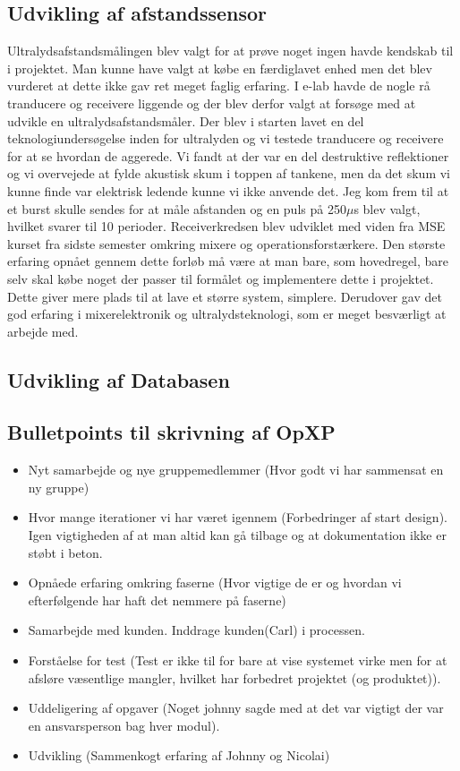 \subsection{Udvikling af afstandssensor}
Ultralydsafstandsmålingen blev valgt for at prøve noget ingen havde kendskab til i projektet. Man kunne have valgt at købe en færdiglavet enhed men det blev vurderet at dette ikke gav ret meget faglig erfaring. I e-lab havde de nogle rå tranducere og receivere liggende og der blev derfor valgt at forsøge med at udvikle en ultralydsafstandsmåler. Der blev i starten lavet en del teknologiundersøgelse inden for ultralyden og vi testede tranducere og receivere for at se hvordan de aggerede. Vi fandt at der var en del destruktive reflektioner og vi overvejede at fylde akustisk skum i toppen af tankene, men da det skum vi kunne finde var elektrisk ledende kunne vi ikke anvende det. Jeg kom frem til at et burst skulle sendes for at måle afstanden og en puls på 250$\mu$s blev valgt, hvilket svarer til 10 perioder. Receiverkredsen blev udviklet med viden fra MSE kurset fra sidste semester omkring mixere og operationsforstærkere. Den største erfaring opnået gennem dette forløb må være at man bare, som hovedregel, bare selv skal købe noget der passer til formålet og implementere dette i projektet. Dette giver mere plads til at lave et større system, simplere. Derudover gav det god erfaring i mixerelektronik og ultralydsteknologi, som er meget besværligt at arbejde med.

\subsection{Udvikling af Databasen}

\subsection{Bulletpoints til skrivning af OpXP}
\begin{itemize}
\item Nyt samarbejde og nye gruppemedlemmer (Hvor godt vi har sammensat en ny gruppe)
\item Hvor mange iterationer vi har været igennem (Forbedringer af start design). Igen vigtigheden af at man altid kan gå tilbage og at dokumentation ikke er støbt i beton.
\item Opnåede erfaring omkring faserne (Hvor vigtige de er og hvordan vi efterfølgende har haft det nemmere på faserne)
\item Samarbejde med kunden. Inddrage kunden(Carl) i processen.
\item Forståelse for test (Test er ikke til for bare at vise systemet virke men for at afsløre væsentlige mangler, hvilket har forbedret projektet (og produktet)).
\item Uddeligering af opgaver (Noget johnny sagde med at det var vigtigt der var en ansvarsperson bag hver modul).
\item Udvikling (Sammenkogt erfaring af Johnny og Nicolai)
\end{itemize}
